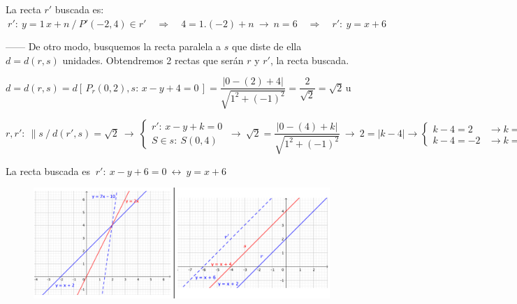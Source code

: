 \begin{miejercicio}
\vspace{2mm} La recta $r'$ buscada es: $\ r':\ y=1\, x+n \ / \ P'(-2,4) \in r' \quad\Rightarrow \quad 4=1.(-2)+n \ \to \ n=6 \quad \Rightarrow \quad r':\ y=x+6$


\vspace{4mm} ------ De otro modo, busquemos la recta paralela a $s$ que diste de ella $d=d(r,s)$ unidades. Obtendremos 2 rectas que serán $r$ y $r'$, la recta buscada.

\vspace{2mm} $d=d(r,s)=d[\, P_r(0,2),s:\, x-y+4=0\, ] =\dfrac{|0-(2)+4|}{\sqrt{1^2+(-1)^2}}= \dfrac 2{\sqrt 2}=\sqrt{2}\, \mathrm{u}$

\vspace{2mm}$r,r':\ \parallel s \ / \ d(r',s)=\sqrt{2} \ \to \ \begin{cases} r':\, x-y+k=0 	\\ S\in s:\ S(0,4) \end{cases} \ \to \ \sqrt{2}=\dfrac{|0-(4)+k|}{\sqrt{1^2+(-1)^2}} \ \to \ 2=|k-4| \to \begin{cases} k-4=2 &\to k=6 \Rightarrow r' \\ k-4=-2 &\to k=2 \Rightarrow r \end{cases}$


\vspace{2mm} La recta buscada es $\ r':\ x-y+6=0 \ \leftrightarrow \ y=x+6$ 

\end{miejercicio}

\begin{figure}[H]
	\centering
	\includegraphics[width=1\textwidth]{img-ga/ga24.png}
\end{figure}

